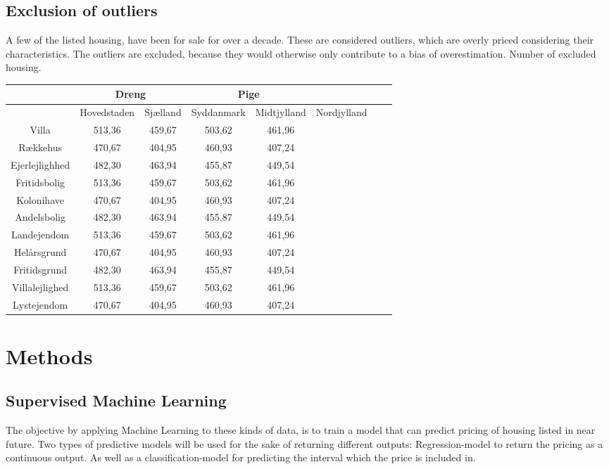 \documentclass[12pt,a4paper]{article}
\begin{document}
\subsection{Exclusion of outliers}
A few of the listed housing, have been for sale for over a decade. These are considered outliers, which are overly priced considering their characteristics. The outliers are excluded, because they would otherwise only contribute to a bias of overestimation. Number of excluded housing.  
\newline
\begin{tabular}{ c | c | c | c | c | c | c | c} 
  \toprule
   & \multicolumn{2}{c|}{Dreng} & \multicolumn{2}{c}{Pige} \\ \hline
   & Hovedstaden & Sjælland & Syddanmark & Midtjylland & Nordjylland \\
   \midrule 
   Villa & 513,36 & 459,67 & 503,62 & 461,96 \\ \hline
   Rækkehus & 470,67 & 404,95 & 460,93 & 407,24 \\ \hline
   Ejerlejlighhed & 482,30 & 463,94 & 455,87 & 449,54 \\ \hline
   Fritidsbolig & 513,36 & 459,67 & 503,62 & 461,96 \\ \hline
   Kolonihave & 470,67 & 404,95 & 460,93 & 407,24 \\ \hline
   Andelsbolig & 482,30 & 463,94 & 455,87 & 449,54 \\ \hline
   Landejendom & 513,36 & 459,67 & 503,62 & 461,96 \\ \hline
   Helårsgrund & 470,67 & 404,95 & 460,93 & 407,24 \\ \hline
   Fritidsgrund & 482,30 & 463,94 & 455,87 & 449,54 \\ \hline
   Villalejlighed & 513,36 & 459,67 & 503,62 & 461,96 \\ \hline
   Lystejendom & 470,67 & 404,95 & 460,93 & 407,24 \\ 
    \bottomrule
\end{tabular}
\newline

\section{Methods}
\subsection{Supervised Machine Learning}
The objective by applying Machine Learning to these kinds of data, is to train a model that can predict pricing of housing listed in near future.
Two types of predictive models will be used for the sake of returning different outputs: Regression-model to return the pricing as a continuous output. As well as a classification-model for predicting the interval which the price is included in. 
\end{document}
